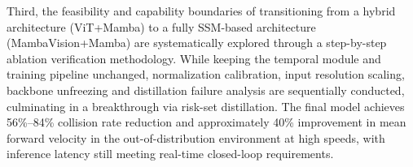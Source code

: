 \begin{englishabstract}
Third, the feasibility and capability boundaries of transitioning from a hybrid architecture (ViT+Mamba) to a fully SSM-based architecture (MambaVision+Mamba) are systematically explored through a step-by-step ablation verification methodology. While keeping the temporal module and training pipeline unchanged, normalization calibration, input resolution scaling, backbone unfreezing and distillation failure analysis are sequentially conducted, culminating in a breakthrough via risk-set distillation. The final model achieves 56\%--84\% collision rate reduction and approximately 40\% improvement in mean forward velocity in the out-of-distribution environment at high speeds, with inference latency still meeting real-time closed-loop requirements. 


\end{englishabstract}
